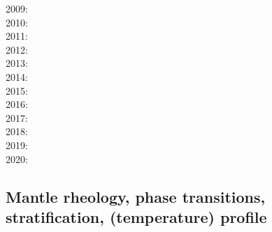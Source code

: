 {2009: \cite{wodd09}\cite{fobe09}\cite{gows09}\cite{deta09}\cite{onlj09}\cite{wazh09}\cite{vavv09}
      \cite{brha09}\cite{scbs09b}\cite{oebm09}\\
2010: \cite{bumb10}\cite{detn10}\cite{yayh10}\cite{nata10}\cite{hole10}\cite{zhzl10}\cite{vayb10}
      \cite{brmw10}\\
2011: \cite{lowm11}\cite{rota11}\cite{woda11}\cite{lemj11}\cite{befa11}\cite{pewb11}\\
2012: \cite{bisa12}\cite{cort12b}\cite{deyt12}\cite{solo12}\cite{wele12}\\
2013: \cite{holj13}\cite{dadb13}\cite{toyd13}\cite{bogs13a}\cite{busa13}\cite{mika13}
      \cite{fabc13}\cite{cosr13}\cite{coml13}\cite{cost13}\cite{stha13}\cite{plth13}\cite{oflb13}\\
2014: \cite{arfw14}\cite{helo14}\cite{crta14}\cite{flgw14}\cite{roct14}\cite{cort14}\cite{becr14}
      \cite{nata14}\cite{stha14}\cite{stlh14}\\
2015: \cite{thkp15}\cite{wegg15}\cite{bect15}\cite{pesw15}\\
2016: \cite{frbs16}\cite{sisc16}\cite{boba16}\cite{wele16}\cite{welm16}\cite{vade16}\cite{chah16}\\
2017: \cite{ghts17}\cite{civj17}\\
2018: \cite{cold18}\cite{arcf18}\cite{cosh18}\cite{wele18}\\
2019: \cite{gult19}\cite{mazh19}\cite{cohf19}\cite{lewh19}\cite{ulcw19}\cite{boba19}\cite{fube19}\\
2020: \cite{lalt20}\cite{gugb20}\cite{yabt20}
}

\subsection{Mantle rheology, phase transitions, stratification, (temperature) profile}

